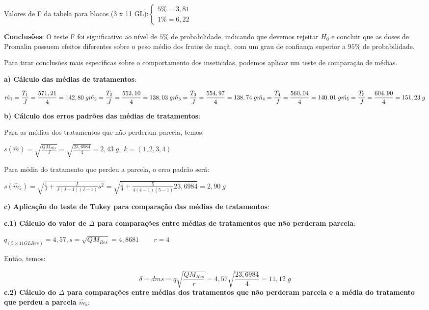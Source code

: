 \documentclass[
]{book}
\begin{document}
Valores de F da tabela para blocos (3 x 11 GL):\(\begin{cases} 5\%=3,81 \\ 1\%=6,22 \end{cases}\)

\textbf{Conclusões}: O teste F foi significativo ao nível de \(5\%\) de probabilidade, indicando que devemos rejeitar \(H_0\) e concluir que as doses de Promalin possuem efeitos diferentes sobre o peso médio dos frutos de maçã, com um grau de confiança superior a \(95\%\) de probabilidade.

Para tirar conclusões mais específicas sobre o comportamento dos inseticidas, podemos aplicar um teste de comparação de médias.

\textbf{a) Cálculo das médias de tratamentos}:

\[
\hat{m_1} = \frac{T_1}{J}=\frac{571,21}{4}=142,80\;g\\
\hat{m_2} = \frac{T_2}{J}=\frac{552,10}{4}=138,03\;g\\
\hat{m_3} = \frac{T_3}{J}=\frac{554,97}{4}=138,74\;g\\
\hat{m_4} = \frac{T_4}{J}=\frac{560,04}{4}=140,01\;g\\
\hat{m_5} = \frac{T_5}{J}=\frac{604,90}{4}=151,23\;g\\
\]

\textbf{b) Cálculo dos erros padrões das médias de tratamentos}:

Para as médias dos tratamentos que não perderam parcela, temos:

\(s(\hat{m})=\sqrt{\frac{QM_{Res}}{J}}=\sqrt{\frac{23,6984}{4}}=2,43\;g,\;k=(1,2,3,4)\)

Para média do tratamento que perdeu a parcela, o erro padrão será:

\(s(\hat{m}_5)=\sqrt{\frac{1}{J}+\frac{I}{J(J-1)(I-1)}s^2}=\sqrt{\frac{1}{4}+\frac{5}{4(4-1)(5-1)}23,6984}=2,90\;g\)

\textbf{c) Aplicação do teste de Tukey para comparação das médias de tratamentos}:

\textbf{c.1) Cálculo do valor de \(\Delta\) para comparações entre médias de tratamentos que não perderam parcela}:

\(q_{(5\times11GLRes)} = 4,57, s=\sqrt{QM_{Res}}=4,8681\;\;\;\;\;\;\;\ r=4\)

Então, temos:

\[
\delta = dms = q\sqrt{\frac{QM_{Res}}{r}}=4,57\sqrt{\frac{23,6984}{4}}=11,12\;g
\]
\textbf{c.2) Cálculo do \(\Delta\) para comparações entre médias dos tratamentos que não perderam parcela e a média do tratamento que perdeu a parcela \(\hat{m}_5\)}:
\end{document}
